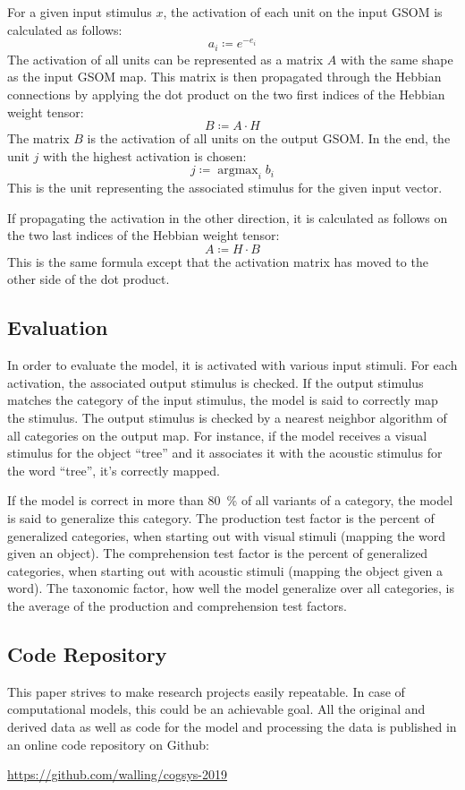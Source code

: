 \documentclass[twocolumn]{article}
\DeclareMathOperator*{\argmax}{argmax}
\begin{document}
For a given input stimulus $x$, the activation of each unit on the input GSOM is calculated as follows: \[
a_i \coloneq e^{-e_i}
\]
The activation of all units can be represented as a matrix $A$ with the same shape as the input GSOM map. This matrix is then propagated through the Hebbian connections by applying the dot product on the two first indices of the Hebbian weight tensor: \[
B \coloneq A \cdot H
\]
The matrix $B$ is the activation of all units on the output GSOM. In the end, the unit $j$ with the highest activation is chosen: \[
j \coloneq \argmax_{i} b_i
\]
This is the unit representing the associated stimulus for the given input vector.

If propagating the activation in the other direction, it is calculated as follows on the two last indices of the Hebbian weight tensor: \[
A \coloneq H \cdot B
\]
This is the same formula except that the activation matrix has moved to the other side of the dot product.

\subsection{Evaluation} \label{sub:evaluation}
In order to evaluate the model, it is activated with various input stimuli. For each activation, the associated output stimulus is checked. If the output stimulus matches the category of the input stimulus, the model is said to correctly map the stimulus. The output stimulus is checked by a nearest neighbor algorithm of all categories on the output map. For instance, if the model receives a visual stimulus for the object \enquote{tree} and it associates it with the acoustic stimulus for the word \enquote{tree}, it's correctly mapped.

If the model is correct in more than 80~\% of all variants of a category, the model is said to generalize this category. The production test factor is the percent of generalized categories, when starting out with visual stimuli (mapping the word given an object). The comprehension test factor is the percent of generalized categories, when starting out with acoustic stimuli (mapping the object given a word). The taxonomic factor, how well the model generalize over all categories, is the average of the production and comprehension test factors.

\subsection{Code Repository} \label{sub:code-repository}
This paper strives to make research projects easily repeatable. In case of computational models, this could be an achievable goal. All the original and derived data as well as code for the model and processing the data is published in an online code repository on Github:
\begin{center}
\url{https://github.com/walling/cogsys-2019}
\end{center}
\end{document}
